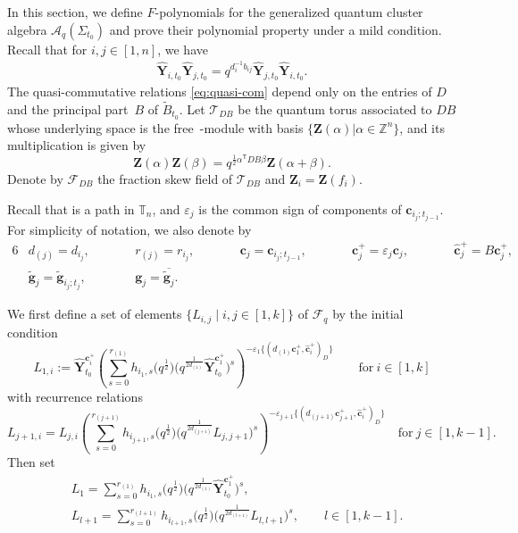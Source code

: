 \documentclass[11pt]{article}
\numberwithin{equation}{section}
\numberwithin{equation}{section}
\begin{document}
 In this section, we define $F$-polynomials for the generalized quantum cluster algebra $\mathcal{A}_q(\Sigma_{t_0})$ and prove their polynomial property under a mild condition.
Recall that for $i,j\in[1,n]$, we have
\begin{align}\label{eq:quasi-com}
\mathbf{\hat{Y}}_{i,t_{0}}\mathbf{\hat{Y}}_{j,t_{0}}=q^{d_{i}^{-1}b_{ij}}\mathbf{\hat{Y}}_{j,t_{0}}\mathbf{\hat{Y}}_{i,t_{0}}.
\end{align}
The quasi-commutative relations \eqref{eq:quasi-com} depend only on the entries of $D$ and the principal part~$B$ of $\tilde{B}_{t_0}$.
Let $\mathcal{T}_{DB}$ be the quantum torus associated to $DB$ whose underlying space is the free~-module with basis $\{\mathbf{Z}(\alpha)| \alpha\in\mathbb{Z}^{n}\}$, and its multiplication is given by
\[\mathbf{Z}(\alpha)\mathbf{Z}(\beta)=q^{\frac{1}{2}\alpha^{\mathsf T}DB\beta}\mathbf{Z}(\alpha+\beta).\]
Denote by $\mathcal{F}_{DB}$ the fraction skew field of $\mathcal{T}_{DB}$ and $\mathbf{Z}_{i}=\mathbf{Z}(f_{i})$.

Recall that  is a path in $\mathbb{T}_n$, and $\varepsilon_{j}$ is the common sign of components of $\mathbf{c}_{i_j;t_{j-1}}$. For simplicity of notation, we also denote by
\begin{alignat*}{6}
& d_{(j)}=d_{i_j},\qquad&&
r_{(j)}=r_{i_j},  \qquad &&  \mathbf{c}_{j}=\mathbf{c}_{i_j;t_{j-1}},\qquad&&    \mathbf{c}_{j}^+=\varepsilon_{j}\mathbf{c}_{j}, \qquad&&   \mathbf{\hat{c}}_{j}^+=B\mathbf{c}_{j}^+,& \\
& \mathbf{\tilde{g}}_{j}=\mathbf{\tilde{g}}_{i_j;t_j}, \qquad&&   \mathbf{g}_{j}=\overline{\mathbf{\tilde{g}}_{j}}.&&&&&&&
\end{alignat*}

We first define a set of elements $\{ L_{i,j}\mid i,j\in [1,k]\}$ of $\mathcal{F}_q$ by the initial condition
\[L_{1,i}:=\mathbf{\hat{Y}}_{t_{0}}^{\mathbf{c}_{i}^{+}}\left(\sum\limits^{r_{(1)}}_{s=0}h_{i_{1},s}
\bigl(q^{\frac{1}{2}}\bigr)\bigl(q^{\frac{1}{2d_{(1)}}}\mathbf{\hat{Y}}_{t_0}^{\mathbf{c}_{1}^{+}}\bigr)^{s}\right)^{-\varepsilon_{1}\{(d_{(1)}\mathbf{c}_{1}^{+},\mathbf{\hat{c}}_{i}^{+})_{D}\}} \qquad \text{for}\  i\in [1,k]
\]
with recurrence relations
\[
 L_{j+1,i}=L_{j,i}\left(\sum\limits^{r_{(j+1)}}_{s=0}h_{i_{j+1},s}\bigl(q^{\frac{1}{2}}\bigr)
 \bigl(q^{\frac{1}{2d_{(j+1)}}}L_{j,j+1}\bigr)^{s} \right)^{-\varepsilon_{j+1}\{(d_{(j+1)}\mathbf{c}_{j+1}^{+},\mathbf{\hat{c}}_{i}^{+})_{D}\}} \quad \text{for}\  j \in [1,k-1].
\]
Then set
\begin{align*}
 &L_1=\sum\limits^{r_{(1)}}_{s=0}h_{i_{1},s}\bigl(q^{\frac{1}{2}}\bigr)\bigl(q^{\frac{1}{2d_{(1)}}}\mathbf{\hat{Y}}_{t_{0}}^{\mathbf{c}_{1}^{+}}\bigr)^{s},\\
 &L_{l+1}=\sum\limits_{s=0}^{r_{(l+1)}}h_{i_{l+1},s}\bigl(q^{\frac{1}{2}}\bigr)\bigl(q^{\frac{1}{2d_{(l+1)}}}L_{l,l+1}\bigr)^{s},\qquad l\in[1,k-1].
 \end{align*}
\end{document}
